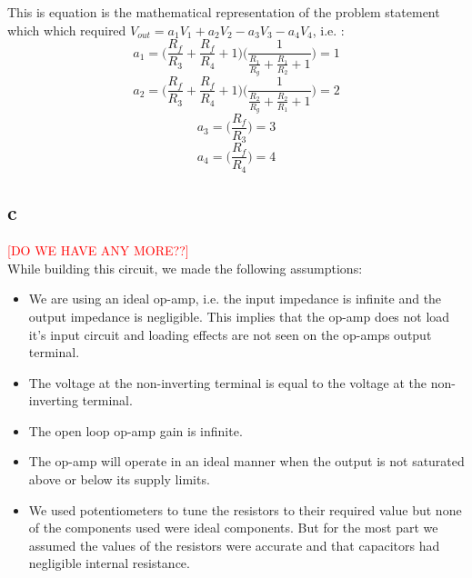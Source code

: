 \documentclass{article}
\newcommand{\xxx}[1]{\textcolor{red}{#1}}
\theoremstyle{plain}
\theoremstyle{definition}
\theoremstyle{remark}
\begin{document}
This is equation is the mathematical representation of the problem statement which which required $V_{out} = a_1V_1 + a_2 V_2 - a_3 V_3 - a_4 V_4$, i.e. :
$$a_1 =  \Big( \frac{R_f}{R_3} + \frac{ R_f}{R_4} + 1\Big) \Big( \frac{1}{\frac{R_1}{R_g} + \frac{R_1}{R_2} + 1}\Big) = 1$$
$$a_2 =  \Big( \frac{R_f}{R_3} + \frac{ R_f}{R_4} + 1\Big) \Big( \frac{1}{\frac{R_2}{R_g} + \frac{R_2}{R_1} + 1} \Big) = 2$$
$$a_3 = \Big( \frac{R_f}{R_3}\Big) = 3$$
$$a_4 = \Big( \frac{ R_f}{R_4}\Big) = 4$$


\subsection*{c}
\xxx{[DO WE HAVE ANY MORE??]}\\
While building this circuit, we made the following assumptions:
\begin{itemize}
\item We are using an ideal op-amp, i.e. the input impedance is infinite and the output impedance is negligible. This implies that the op-amp does not load it's input circuit and loading effects are not seen on the op-amps output terminal.

\item The voltage at the non-inverting terminal is equal to the voltage at the non-inverting terminal.

\item The open loop op-amp gain is infinite.

\item The op-amp will operate in an ideal manner when the output is not saturated above or below its supply limits.

\item We used potentiometers to tune the resistors to their required value but none of the components used were ideal components. But for the most part we assumed the values of the resistors were accurate and that capacitors had negligible internal resistance.

\end{itemize}
\end{document}
